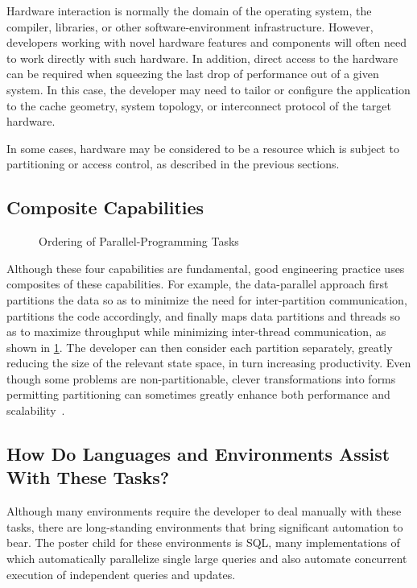 Hardware interaction is normally the domain of the operating system,
the compiler, libraries, or other software-environment infrastructure.
However, developers working with novel hardware features and components
will often need to work directly with such hardware.
In addition, direct access to the hardware can be required when squeezing
the last drop of performance out of a given system.
In this case, the developer may need to tailor or configure the application
to the cache geometry, system topology, or interconnect protocol of the
target hardware.

In some cases, hardware may be considered to be a resource which
is subject to partitioning or access control, as described in
the previous sections.

\subsection{Composite Capabilities}
\label{sec:Composite Capabilities}

\begin{figure}
\centering
{}
\caption{Ordering of Parallel-Programming Tasks}
\label{fig:intro:Ordering of Parallel-Programming Tasks}
\end{figure}

Although these four capabilities are fundamental,
good engineering practice uses composites of
these capabilities.
For example, the data-parallel approach first
partitions the data so as to minimize the need for
inter-partition communication, partitions the code accordingly,
and finally maps data partitions and threads so as to maximize
throughput while minimizing inter-thread communication,
as shown in
\cref{fig:intro:Ordering of Parallel-Programming Tasks}.
The developer can then
consider each partition separately, greatly reducing the size
of the relevant state space, in turn increasing productivity.
Even though some problems are non-partitionable,
clever transformations into forms permitting partitioning can
sometimes greatly enhance
both performance and scalability~\cite{PanagiotisMetaxas1999PDCS}.

\subsection{How Do Languages and Environments Assist With These Tasks?}
\label{sec:intro:How Do Languages and Environments Assist With These Tasks?}

Although many environments require the developer to deal manually
with these tasks, there are long-standing environments that bring
significant automation to bear.
The poster child for these environments is SQL, many implementations
of which automatically parallelize single large queries and also
automate concurrent execution of independent queries and updates.

